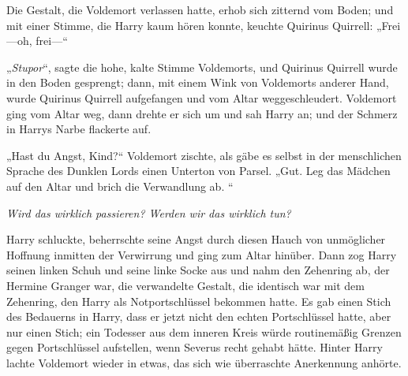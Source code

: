 Die Gestalt, die Voldemort verlassen hatte, erhob sich zitternd vom Boden; und mit einer Stimme, die Harry kaum hören konnte, keuchte Quirinus Quirrell: „Frei—oh, frei—“

„\emph{Stupor}“, sagte die hohe, kalte Stimme Voldemorts, und Quirinus Quirrell wurde in den Boden gesprengt; dann, mit einem Wink von Voldemorts anderer Hand, wurde Quirinus Quirrell aufgefangen und vom Altar weggeschleudert.
Voldemort ging vom Altar weg, dann drehte er sich um und sah Harry an; und der Schmerz in Harrys Narbe flackerte auf.

„Hast du Angst, Kind?“ Voldemort zischte, als gäbe es selbst in der menschlichen Sprache des Dunklen Lords einen Unterton von Parsel.
„Gut. Leg das Mädchen auf den Altar und brich die Verwandlung ab. “

\emph{Wird das wirklich passieren? Werden wir das wirklich tun?}

Harry schluckte, beherrschte seine Angst durch diesen Hauch von unmöglicher Hoffnung inmitten der Verwirrung und ging zum Altar hinüber. Dann zog Harry seinen linken Schuh und seine linke Socke aus und nahm den Zehenring ab, der Hermine Granger war, die verwandelte Gestalt, die identisch war mit dem Zehenring, den Harry als Notportschlüssel bekommen hatte. Es gab einen Stich des Bedauerns in Harry, dass er jetzt nicht den echten Portschlüssel hatte, aber nur einen Stich; ein Todesser aus dem inneren Kreis würde routinemäßig Grenzen gegen Portschlüssel aufstellen, wenn Severus recht gehabt hätte.
Hinter Harry lachte Voldemort wieder in etwas, das sich wie überraschte Anerkennung anhörte.

